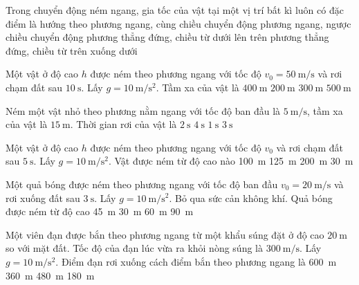 \begin{ex}
	Trong chuyển động ném ngang, gia tốc của vật tại một vị trí bất kì luôn có đặc điểm là hướng theo
	\choice
	{phương ngang, cùng chiều chuyển động}
	{phương ngang, ngược chiều chuyển động}
	{phương thẳng đứng, chiều từ dưới lên trên}
	{phương thẳng đứng, chiều từ trên xuống dưới}
	\loigiai{}
\end{ex}
\begin{ex}
Một vật ở độ cao $h$ được ném theo phương ngang với tốc độ $v_0=\SI{50}{\meter/\second}$ và rơi chạm đất sau $\SI{10}{\second}$. Lấy $g=\SI{10}{\meter/\second^2}$. Tầm xa của vật là	
	\choice
	{$\SI{400}{\meter}$}
	{$\SI{200}{\meter}$}
	{$\SI{300}{\meter}$}
	{$\SI{500}{\meter}$}
	\loigiai{}
\end{ex}
\begin{ex}
	Ném một vật nhỏ theo phương nằm ngang với tốc độ ban đầu là $\SI{5}{\meter/\second}$, tầm xa của vật là $\SI{15}{\meter}$. Thời gian rơi của vật là
	\choice
	{$\SI{2}{\second}$}
	{$\SI{4}{\second}$}
	{$\SI{1}{\second}$}
	{$\SI{3}{\second}$}
	\loigiai{}
\end{ex}
\begin{ex}
	Một vật ở độ cao $h$ được ném theo phương ngang với tốc độ $v_0$ và rơi chạm đất sau $\SI{5}{\second}$. Lấy $g=\SI{10}{\meter/\second^2}$. Vật được ném từ độ cao nào
	\choice
	{\SI{100}{\meter}}
	{\SI{125}{\meter}}
	{\SI{200}{\meter}}
	{\SI{30}{\meter}}
	\loigiai{}
\end{ex}
\begin{ex}
	Một quả bóng được ném theo phương ngang với tốc độ ban đầu $v_0=\SI{20}{\meter/\second}$ và rơi xuống đất sau $\SI{3}{\second}$. Lấy $g=\SI{10}{\meter/\second^2}$. Bỏ qua sức cản không khí. Quả bóng được ném từ độ cao
	\choice
	{\SI{45}{\meter}}
	{\SI{30}{\meter}}
	{\SI{60}{\meter}}
	{\SI{90}{\meter}}
	\loigiai{}
\end{ex}
\begin{ex}
	Một viên đạn được bắn theo phương ngang từ một khẩu súng đặt ở độ cao $\SI{20}{\meter}$ so với mặt đất. Tốc độ của đạn lúc vừa ra khỏi nòng súng là $\SI{300}{\meter/\second}$. Lấy $g=\SI{10}{\meter/\second^2}$. Điểm đạn rơi xuống cách điểm bắn theo phương ngang là
	\choice
	{\SI{600}{\meter}}
	{\SI{360}{\meter}}
	{\SI{480}{\meter}}
	{\SI{180}{\meter}}
	\loigiai{}
\end{ex}
